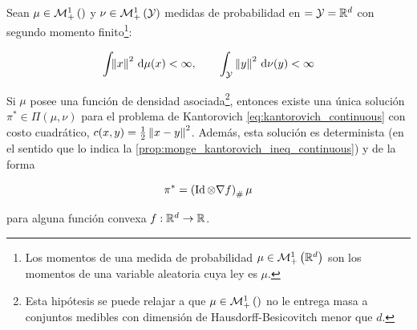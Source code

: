 \begin{teo}[Brenier]
	\label{teo:brenier}
	Sean $\mu\in\mathcal{M}_+^1\left(\right)$ y $\nu\in\mathcal{M}_+^1\left(\mathcal{Y}\right)$ medidas de probabilidad en $=\mathcal{Y}=\mathbb{R}^d$ con segundo momento finito\footnote{Los momentos de una medida de probabilidad $\mu\in\mathcal{M}_+^1\left(\mathbb{R}^d\right)$ son los momentos de una variable aleatoria cuya ley es $\mu$.}:

	\begin{equation*}
		\int_{} \left\lVert x \right\rVert^2 \,\operatorname{d}\!\mu(x)<\infty,
		\qquad
		\int_{\mathcal{Y}} \left\lVert y \right\rVert^2 \,\operatorname{d}\!\nu(y)<\infty
	\end{equation*}

	Si $\mu$ posee una función de densidad asociada\footnote{Esta hipótesis se puede relajar a que $\mu\in\mathcal{M}_+^1\left(\right)$ no le entrega masa a conjuntos medibles con dimensión de Hausdorff-Besicovitch menor que $d$.}, entonces existe una única solución $\pi^*\in\Pi(\mu,\nu)$ para el problema de Kantorovich \eqref{eq:kantorovich_continuous} con costo cuadrático, $c(x,y)=\frac{1}{2}\left\lVert x-y \right\rVert^2$. Además, esta solución es determinista (en el sentido que lo indica la \autoref{prop:monge_kantorovich_ineq_continuous}) y de la forma

	\begin{equation*}
		\pi^* = \left(\operatorname{Id}\otimes \nabla f\right)_\#\mu
	\end{equation*}

	para alguna función convexa $f:\mathbb{R}^d\to\mathbb{R}$.
\end{teo}

